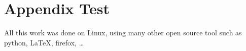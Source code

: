 \chapter{Appendix Test}
\label{chap:appendix}
All this work was done on Linux, using many other open source tool such as
python, \LaTeX, firefox, …
